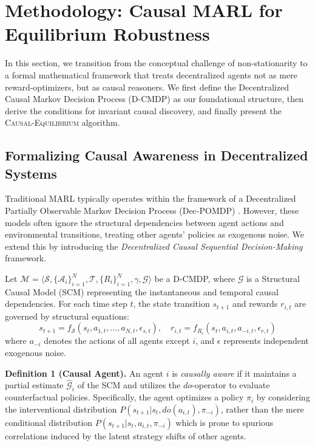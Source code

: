 \section{Methodology: Causal MARL for Equilibrium Robustness}

In this section, we transition from the conceptual challenge of non-stationarity to a formal mathematical framework that treats decentralized agents not as mere reward-optimizers, but as causal reasoners. We first define the Decentralized Causal Markov Decision Process (D-CMDP) as our foundational structure, then derive the conditions for invariant causal discovery, and finally present the \textsc{Causal-Equilibrium} algorithm.

\subsection{Formalizing Causal Awareness in Decentralized Systems}

Traditional MARL typically operates within the framework of a Decentralized Partially Observable Markov Decision Process (Dec-POMDP) \cite{bernstein2002complexity}. However, these models often ignore the structural dependencies between agent actions and environmental transitions, treating other agents' policies as exogenous noise. We extend this by introducing the \textit{Decentralized Causal Sequential Decision-Making} framework.

Let $\mathcal{M} = \langle \mathcal{S}, \{\mathcal{A}_i\}_{i=1}^N, \mathcal{T}, \{R_i\}_{i=1}^N, \gamma, \mathcal{G} \rangle$ be a D-CMDP, where $\mathcal{G}$ is a Structural Causal Model (SCM) \cite{pearl2009causality} representing the instantaneous and temporal causal dependencies. For each time step $t$, the state transition $s_{t+1}$ and rewards $r_{i,t}$ are governed by structural equations:
\begin{equation}
s_{t+1} = f_{\mathcal{S}}(s_t, a_{1,t}, \dots, a_{N,t}, \epsilon_{s,t}), \quad r_{i,t} = f_{R_i}(s_t, a_{i,t}, a_{-i,t}, \epsilon_{r,t})
\end{equation}
where $a_{-i}$ denotes the actions of all agents except $i$, and $\epsilon$ represents independent exogenous noise.

\textbf{Definition 1 (Causal Agent).} An agent $i$ is \textit{causally aware} if it maintains a partial estimate $\hat{\mathcal{G}}_i$ of the SCM and utilizes the $do$-operator to evaluate counterfactual policies. Specifically, the agent optimizes a policy $\pi_i$ by considering the interventional distribution $P(s_{t+1} | s_t, do(a_{i,t}), \pi_{-i})$, rather than the mere conditional distribution $P(s_{t+1} | s_t, a_{i,t}, \pi_{-i})$ which is prone to spurious correlations induced by the latent strategy shifts of other agents.

